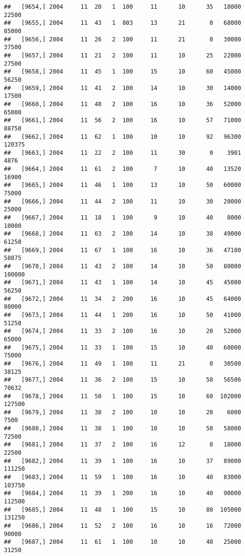 \documentclass{article}\usepackage[]{graphicx}\usepackage[]{color}
\makeatletter
\newenvironment{kframe}{%
 \def\at@end@of@kframe{}%
 \ifinner\ifhmode%
  \def\at@end@of@kframe{\end{minipage}}%
  \begin{minipage}{\columnwidth}%
 \fi\fi%
 \def\FrameCommand##1{\hskip\@totalleftmargin \hskip-\fboxsep
 \colorbox{shadecolor}{##1}\hskip-\fboxsep
     \hskip-\linewidth \hskip-\@totalleftmargin \hskip\columnwidth}%
 \MakeFramed {\advance\hsize-\width
   \@totalleftmargin\z@ \linewidth\hsize
   \@setminipage}}%
 {\par\unskip\endMakeFramed%
 \at@end@of@kframe}
\newenvironment{knitrout}{}{} %
\makeatother
\begin{document}
\begin{knitrout}
\begin{kframe}
\begin{verbatim}
##   [9654,] 2004     11  20   1  100     11      10      35   18000   22500
##   [9655,] 2004     11  43   1  803     13      21       0   68000   85000
##   [9656,] 2004     11  26   2  100     11      21       0   30000   37500
##   [9657,] 2004     11  21   2  100     11      10      25   22000   27500
##   [9658,] 2004     11  45   1  100     15      10      60   45000   56250
##   [9659,] 2004     11  41   2  100     14      10      30   14000   17500
##   [9660,] 2004     11  48   2  100     16      10      36   52000   65000
##   [9661,] 2004     11  56   2  100     16      10      57   71000   88750
##   [9662,] 2004     11  62   1  100     10      10      92   96300  120375
##   [9663,] 2004     11  22   2  100     11      30       0    3901    4876
##   [9664,] 2004     11  61   2  100      7      10      40   13520   16900
##   [9665,] 2004     11  46   1  100     13      10      50   60000   75000
##   [9666,] 2004     11  44   2  100     11      10      30   20000   25000
##   [9667,] 2004     11  18   1  100      9      10      40    8000   10000
##   [9668,] 2004     11  63   2  100     14      10      38   49000   61250
##   [9669,] 2004     11  67   1  100     16      10      36   47100   58875
##   [9670,] 2004     11  43   2  100     14      10      50   80000  100000
##   [9671,] 2004     11  43   1  100     14      10      45   45000   56250
##   [9672,] 2004     11  34   2  200     16      10      45   64000   80000
##   [9673,] 2004     11  44   1  200     16      10      50   41000   51250
##   [9674,] 2004     11  33   2  100     16      10      20   52000   65000
##   [9675,] 2004     11  33   1  100     15      10      40   60000   75000
##   [9676,] 2004     11  49   1  100     11      21       0   30500   38125
##   [9677,] 2004     11  36   2  100     15      10      50   56506   70632
##   [9678,] 2004     11  50   1  100     15      10      60  102000  127500
##   [9679,] 2004     11  38   2  100     10      10      20    6000    7500
##   [9680,] 2004     11  38   1  100     10      10      50   58000   72500
##   [9681,] 2004     11  37   2  100     16      12       0   18000   22500
##   [9682,] 2004     11  39   1  100     16      10      37   89000  111250
##   [9683,] 2004     11  59   1  100     16      10      40   83000  103750
##   [9684,] 2004     11  39   1  200     16      10      40   90000  112500
##   [9685,] 2004     11  48   1  100     15      10      80  105000  131250
##   [9686,] 2004     11  52   2  100     16      10      16   72000   90000
##   [9687,] 2004     11  61   1  100     10      10      40   25000   31250

\end{verbatim}
\end{kframe}
\end{knitrout}
\end{document}

